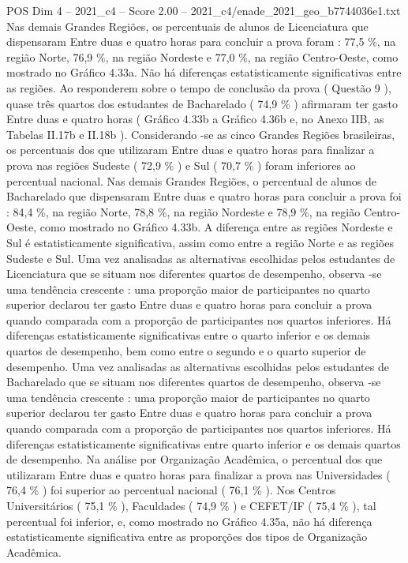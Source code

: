 \begin{textsample}{POS Dim 4 – 2021\_c4 – Score 2.00 – 2021\_c4/enade\_2021\_geo\_b7744036e1.txt}
Nas demais Grandes Regiões, os percentuais de alunos de Licenciatura que dispensaram Entre duas e quatro horas para concluir a prova foram : 77,5 \%, na região Norte, 76,9 \%, na região Nordeste e 77,0 \%, na região Centro-Oeste, como mostrado no Gráfico 4.33a.
Não há diferenças estatisticamente significativas entre as regiões.
Ao responderem sobre o tempo de conclusão da prova ( Questão 9 ), quase três quartos dos estudantes de Bacharelado ( 74,9 \% ) afirmaram ter gasto Entre duas e quatro horas ( Gráfico 4.33b a Gráfico 4.36b e, no Anexo IIB, as Tabelas II.17b e II.18b ).
Considerando -se as cinco Grandes Regiões brasileiras, os percentuais dos que utilizaram Entre duas e quatro horas para finalizar a prova nas regiões Sudeste ( 72,9 \% ) e Sul ( 70,7 \% ) foram inferiores ao percentual nacional.
Nas demais Grandes Regiões, o percentual de alunos de Bacharelado que dispensaram Entre duas e quatro horas para concluir a prova foi : 84,4 \%, na região Norte, 78,8 \%, na região Nordeste e 78,9 \%, na região Centro-Oeste, como mostrado no Gráfico 4.33b.
A diferença entre as regiões Nordeste e Sul é estatisticamente significativa, assim como entre a região Norte e as regiões Sudeste e Sul.
Uma vez analisadas as alternativas escolhidas pelos estudantes de Licenciatura que se situam nos diferentes quartos de desempenho, observa -se uma tendência crescente : uma proporção maior de participantes no quarto superior declarou ter gasto Entre duas e quatro horas para concluir a prova quando comparada com a proporção de participantes nos quartos inferiores.
Há diferenças estatisticamente significativas entre o quarto inferior e os demais quartos de desempenho, bem como entre o segundo e o quarto superior de desempenho.
Uma vez analisadas as alternativas escolhidas pelos estudantes de Bacharelado que se situam nos diferentes quartos de desempenho, observa -se uma tendência crescente : uma proporção maior de participantes no quarto superior declarou ter gasto Entre duas e quatro horas para concluir a prova quando comparada com a proporção de participantes nos quartos inferiores.
Há diferenças estatisticamente significativas entre quarto inferior e os demais quartos de desempenho.
Na análise por Organização Acadêmica, o percentual dos que utilizaram Entre duas e quatro horas para finalizar a prova nas Universidades ( 76,4 \% ) foi superior ao percentual nacional ( 76,1 \% ).
Nos Centros Universitários ( 75,1 \% ), Faculdades ( 74,9 \% ) e CEFET/IF ( 75,4 \% ), tal percentual foi inferior, e, como mostrado no Gráfico 4.35a, não há diferença estatisticamente significativa entre as proporções dos tipos de Organização Acadêmica.

\end{textsample}
